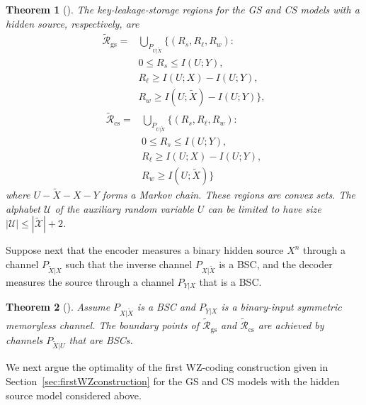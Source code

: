 \documentclass[journal,10pt,twoside]{IEEEtran}
\newtheorem{theorem}{Theorem}
\begin{document}
\begin{theorem}[\hspace{1sp}\cite{bizimTIFSMultipleMeasurement}]\label{theo:regionsforhiddensource}
	The key-leakage-storage regions for the GS and CS models with a hidden source, respectively, are 
	\begin{align}
	\widetilde{\mathcal{R}}_{\text{gs}}\! =\! &\bigcup_{P_{U|\widetilde{X}}}\!\Big\{\left(R_s,R_\ell,R_w\right)\!\colon\!\nonumber\\
	&0\leq R_s\leq I(U;Y),\nonumber\\
	&R_\ell\geq I(U;X) - I(U;Y),\nonumber\\
	&R_w\geq I(U;\widetilde{X})- I(U;Y)\Big\}\label{eq:rateregionhiddengenerated},
	\end{align}
	\vspace*{-0.2cm}
	\begin{align}
	\widetilde{\mathcal{R}}_{\text{cs}}\! =\! &\bigcup_{P_{U|\widetilde{X}}}\!\Big\{\left(R_s,R_\ell,R_w\right)\!\colon\! \nonumber\\
	&0\leq R_s\leq I(U;Y),\nonumber\\
	&R_\ell\geq I(U;X) - I(U;Y),\nonumber\\
	&R_w\geq I(U;\widetilde{X})\Big\}\label{eq:rateregionhiddenchosen}
	\end{align}
	where $U-\widetilde{X}-X-Y$ forms a Markov chain. These regions are convex sets. The alphabet $\mathcal{U}$ of the auxiliary random variable $U$ can be limited to have size $\displaystyle |\mathcal{U}|\!\leq\!|\mathcal{\widetilde{X}}|+2$. 
\end{theorem}

Suppose next that the encoder measures a binary hidden source $X^n$ through a channel $P_{\widetilde{X}|X}$ such that the inverse channel $P_{X|\widetilde{X}}$ is a BSC, and the decoder measures the source through a channel $\displaystyle P_{Y|X}$ that is a BSC.  

\begin{theorem}[\hspace{1sp}\cite{bizimTIFSMultipleMeasurement}]\label{theo:OptimalityofBSCUtoXtilde}
	Assume $P_{X|\widetilde{X}}$ is a BSC and $\displaystyle P_{Y|X}$ is a binary-input symmetric memoryless channel. The boundary points of $\displaystyle \widetilde{\mathcal{R}}_{\text{gs}}$ and $\displaystyle \widetilde{\mathcal{R}}_{\text{cs}}$ are achieved by channels $\displaystyle P_{\widetilde{X}|U}$ that are BSCs. 
\end{theorem}

We next argue the optimality of the first WZ-coding construction given in Section~\ref{sec:firstWZconstruction} for the GS and CS models with the hidden source model considered above.
\end{document}
